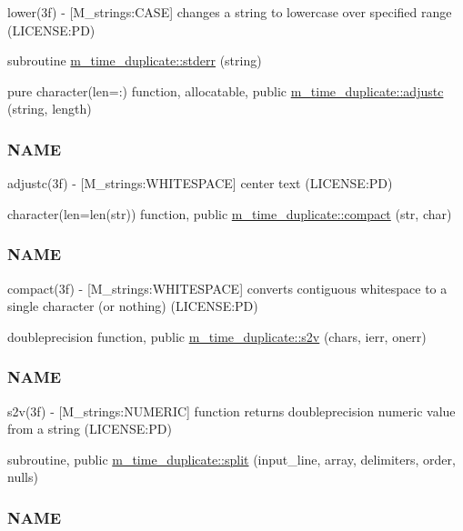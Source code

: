 \begin{DoxyCompactItemize}
\begin{DoxyCompactList}
lower(3f) -\/ \mbox{[}M\+\_\+strings\+:C\+A\+SE\mbox{]} changes a string to lowercase over specified range (L\+I\+C\+E\+N\+SE\+:PD) \end{DoxyCompactList}\item 
subroutine \mbox{\hyperlink{namespacem__time__duplicate_aaf5c25d7bce4f2776df6c1e586b2e277}{m\+\_\+time\+\_\+duplicate\+::stderr}} (string)
\item 
pure character(len=\+:) function, allocatable, public \mbox{\hyperlink{namespacem__time__duplicate_a487dbbb116d2c7022b39869d4990cf6f}{m\+\_\+time\+\_\+duplicate\+::adjustc}} (string, length)
\begin{DoxyCompactList}\small\item\em \subsubsection*{N\+A\+ME}

adjustc(3f) -\/ \mbox{[}M\+\_\+strings\+:W\+H\+I\+T\+E\+S\+P\+A\+CE\mbox{]} center text (L\+I\+C\+E\+N\+SE\+:PD) \end{DoxyCompactList}\item 
character(len=len(str)) function, public \mbox{\hyperlink{namespacem__time__duplicate_a20fc022f66383c65302e990c00432f38}{m\+\_\+time\+\_\+duplicate\+::compact}} (str, char)
\begin{DoxyCompactList}\small\item\em \subsubsection*{N\+A\+ME}

compact(3f) -\/ \mbox{[}M\+\_\+strings\+:W\+H\+I\+T\+E\+S\+P\+A\+CE\mbox{]} converts contiguous whitespace to a single character (or nothing) (L\+I\+C\+E\+N\+SE\+:PD) \end{DoxyCompactList}\item 
doubleprecision function, public \mbox{\hyperlink{namespacem__time__duplicate_a118f0d70fa6f319fbd773008c7f86ef9}{m\+\_\+time\+\_\+duplicate\+::s2v}} (chars, ierr, onerr)
\begin{DoxyCompactList}\small\item\em \subsubsection*{N\+A\+ME}

s2v(3f) -\/ \mbox{[}M\+\_\+strings\+:N\+U\+M\+E\+R\+IC\mbox{]} function returns doubleprecision numeric value from a string (L\+I\+C\+E\+N\+SE\+:PD) \end{DoxyCompactList}\item 
subroutine, public \mbox{\hyperlink{namespacem__time__duplicate_a326e0d62d92969a231864997eea2ab98}{m\+\_\+time\+\_\+duplicate\+::split}} (input\+\_\+line, array, delimiters, order, nulls)
\begin{DoxyCompactList}\small\item\em \subsubsection*{N\+A\+ME}


\end{DoxyCompactList}
\end{DoxyCompactItemize}
